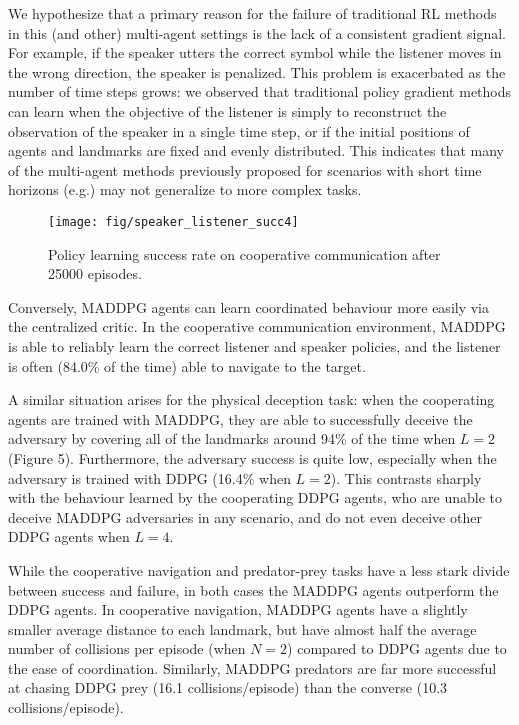 \documentclass{article}
\begin{document}
We hypothesize that a primary reason for the failure of traditional RL methods in this (and other) multi-agent settings is the lack of a consistent gradient signal. %
For example, if the speaker utters the correct symbol while the listener moves in the wrong direction, the speaker is penalized. This problem is exacerbated as the number of time steps grows: we observed that traditional policy gradient methods can learn when the objective of the listener is simply to reconstruct the observation of the speaker in a single time step, or if the initial positions of agents and landmarks are fixed and evenly distributed. This indicates that many of the multi-agent methods previously proposed for scenarios with short time horizons (e.g.\@ \cite{lazaridou2016multi}) may not generalize to more complex tasks.



\begin{wrapfigure}{l}{0.5\textwidth}
\centering
\texttt{[image: fig/speaker\_listener\_succ4]}
\caption{\label{fig:comm_succ} Policy learning success rate on cooperative communication after 25000 episodes. \vspace{-4mm}}
\end{wrapfigure}
Conversely, MADDPG agents can learn coordinated behaviour more easily via the centralized critic. In the cooperative communication environment, MADDPG is able to reliably learn the correct listener and speaker policies, and the listener is often (84.0\% of the time) able to navigate to the target.

A similar situation arises for the physical deception task: when the cooperating agents are trained with MADDPG, they are able to successfully deceive the adversary by covering all of the landmarks around 94\% of the time when $L=2$ (Figure 5). Furthermore, the adversary success is quite low, especially when the adversary is trained with DDPG (16.4\% when $L=2$). This contrasts sharply with the behaviour learned by the cooperating DDPG agents, who are unable to deceive MADDPG adversaries in any scenario, and do not even deceive other DDPG agents when $L=4$.

While the cooperative navigation and predator-prey tasks have a less stark divide between success and failure, in both cases the MADDPG agents outperform the DDPG agents. In cooperative navigation, MADDPG agents have a slightly smaller average distance to each landmark, but have almost half the average number of collisions per episode (when $N=2$) compared to DDPG agents due to the ease of coordination. Similarly, MADDPG predators are far more successful at chasing DDPG prey (16.1 collisions/episode) than the converse (10.3 collisions/episode).
\end{document}

